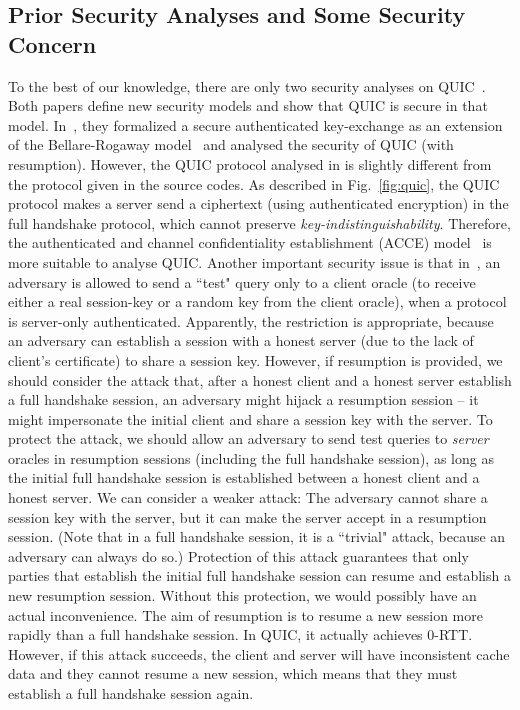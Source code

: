 \subsection{Prior Security Analyses and Some Security Concern} \label{sec:concern}
To the best of our knowledge, there are only two
security analyses on QUIC~\cite{FG14:QUIC,LJBN15:QUIC}.
Both papers define new security models and show that
QUIC is secure in that model.
In~\cite{FG14:QUIC}, they formalized a secure
authenticated key-exchange as an extension of the
Bellare-Rogaway model~\cite{BR93:AKE} and analysed the
security of QUIC (with resumption).
However, the QUIC protocol analysed in \cite{FG14:QUIC}
is slightly different from the protocol given in the
source codes.
As described in Fig.~\ref{fig:quic}, the QUIC protocol
makes a server send a ciphertext (using authenticated
encryption) in the full handshake protocol, which cannot
preserve \textit{key-indistinguishability}.
Therefore, the authenticated and channel confidentiality
establishment (ACCE) model~\cite{JKSS12:ACCE} is more
suitable to analyse QUIC.
Another important security issue is that in~\cite{FG14:QUIC},
an adversary is allowed to send a ``test" query only to
a client oracle (to receive either a real session-key or
a random key from the client oracle),  when a protocol
is server-only authenticated.
Apparently, the restriction is appropriate, because
an adversary can establish a session with a honest
server (due to the lack of client's certificate) to
share a session key.
However, if resumption is provided, we should consider
the attack that, after a honest client and a honest
server establish a full handshake session, an adversary
might hijack a resumption session -- it might
impersonate the initial client and share a session key
with the server.
To protect the attack, we should allow an adversary to
send test queries to \textit{server} oracles in resumption
sessions (including the full handshake session), as long
as the initial full handshake session is established
between a honest client and a honest server.
We can consider a weaker attack: The adversary cannot
share a session key with the server, but it can make the
server accept in a resumption session. (Note that in a
full handshake session, it is a ``trivial" attack, because
an adversary can always do so.)
Protection of this attack guarantees that only parties
that establish the initial full handshake session can
resume and establish a new resumption session.
Without this protection, we would possibly have an actual
inconvenience.
The aim of resumption is to resume a new session more
rapidly than a full handshake session.
In QUIC, it actually achieves $0$-RTT.
However, if this attack succeeds, the client and server
will have inconsistent cache data and they cannot resume
a new session, which means that they must establish a
full handshake session again.

